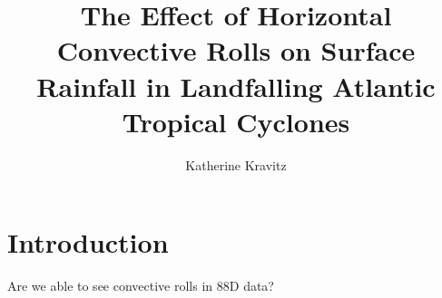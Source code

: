 \documentclass[12pt]{article}
\author{Katherine Kravitz} \title{The Effect of Horizontal Convective Rolls on Surface Rainfall in Landfalling Atlantic Tropical Cyclones}
\begin{document}
\maketitle


\section{Introduction}


Are we able to see convective rolls in 88D data?
\end{document}
